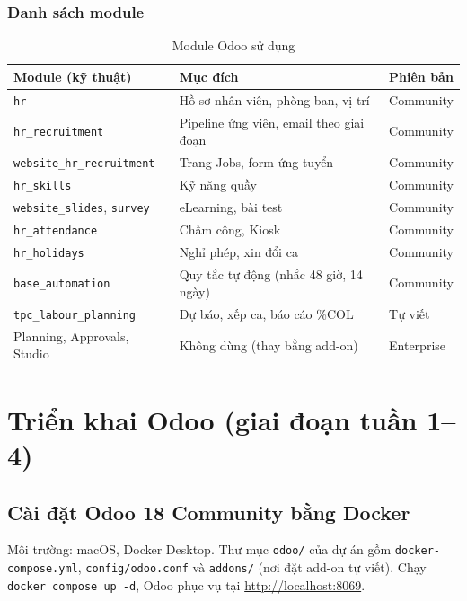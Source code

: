 \documentclass[12pt,a4paper,oneside]{report}
\begin{document}
\subsection{Danh sách module}
\begin{table}[H]\centering\small
\caption{Module Odoo sử dụng}\label{tab:modules}
\begin{tabularx}{\linewidth}{L{4.6cm}YC{2.3cm}}
\toprule \textbf{Module (kỹ thuật)} & \textbf{Mục đích} & \textbf{Phiên bản} \\\midrule
\texttt{hr} & Hồ sơ nhân viên, phòng ban, vị trí & Community \\
\texttt{hr\_recruitment} & Pipeline ứng viên, email theo giai đoạn & Community \\
\texttt{website\_hr\_recruitment} & Trang Jobs, form ứng tuyển & Community \\
\texttt{hr\_skills} & Kỹ năng quầy & Community \\
\texttt{website\_slides}, \texttt{survey} & eLearning, bài test & Community \\
\texttt{hr\_attendance} & Chấm công, Kiosk & Community \\
\texttt{hr\_holidays} & Nghỉ phép, xin đổi ca & Community \\
\texttt{base\_automation} & Quy tắc tự động (nhắc 48 giờ, 14 ngày) & Community \\
\texttt{tpc\_labour\_planning} & Dự báo, xếp ca, báo cáo \%COL & Tự viết \\
Planning, Approvals, Studio & Không dùng (thay bằng add-on) & Enterprise \\
\bottomrule
\end{tabularx}
\end{table}

\chapter{Triển khai Odoo (giai đoạn tuần 1–4)}

\section{Cài đặt Odoo 18 Community bằng Docker}
Môi trường: macOS, Docker Desktop. Thư mục \texttt{odoo/} của dự án gồm \texttt{docker-compose.yml}, \texttt{config/odoo.conf} và \texttt{addons/} (nơi đặt add-on tự viết). Chạy \texttt{docker compose up -d}, Odoo phục vụ tại \url{http://localhost:8069}.
\end{document}
